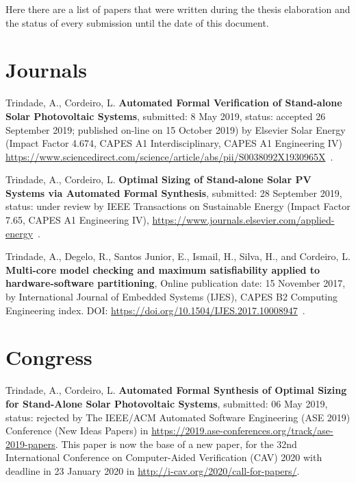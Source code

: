%
Here there are a list of papers that were written during the thesis elaboration and the status of every submission until the date of this document.


\section{Journals}

Trindade, A., Cordeiro, L. \textbf{Automated Formal Verification of Stand-alone Solar Photovoltaic Systems}, submitted: 8 May 2019, status: accepted 26 September 2019; published on-line on 15 October 2019) by Elsevier Solar Energy (Impact Factor 4.674, CAPES A1 Interdisciplinary, CAPES A1 Engineering IV) \url{https://www.sciencedirect.com/science/article/abs/pii/S0038092X1930965X}~\cite{TrindadeCordeiro19}.

Trindade, A., Cordeiro, L. \textbf{Optimal Sizing of Stand-alone Solar PV Systems via Automated Formal Synthesis}, submitted: 28 September 2019, status: under review by IEEE Transactions on Sustainable Energy (Impact Factor 7.65, CAPES A1 Engineering IV), \url{https://www.journals.elsevier.com/applied-energy}~\cite{abs-1909-13139}.

Trindade, A., Degelo, R., Santos Junior, E., Ismail, H., Silva, H., and Cordeiro, L. \textbf{Multi-core model checking and maximum satisfiability applied to hardware-software partitioning}, Online publication date: 15 November 2017, by International Journal of Embedded Systems (IJES), CAPES B2 Computing Engineering index. DOI:   \url {https://doi.org/10.1504/IJES.2017.10008947}~\cite{TrindadeDJISC17}.


\section{Congress}

Trindade, A., Cordeiro, L. \textbf{Automated Formal Synthesis of Optimal Sizing for Stand-Alone Solar Photovoltaic Systems}, submitted: 06 May 2019, status: rejected by The IEEE/ACM Automated Software Engineering (ASE 2019) Conference (New Ideas Papers) in \url{https://2019.ase-conferences.org/track/ase-2019-papers}. This paper is now the base of a new paper, for the 32nd International Conference on Computer-Aided Verification (CAV) 2020 with deadline in 23 January 2020 in \url{http://i-cav.org/2020/call-for-papers/}.

